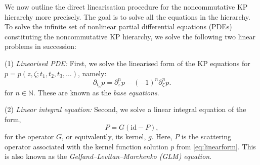 \documentclass[5p,twocolumn]{elsarticle}
\newcommand*{\id}{{\mathrm{id}}}
\newcommand*{\pa}{{\partial}}
\begin{document}
We now outline the direct linearisation procedure for the noncommutative KP hierarchy more precisely. 
The goal is to solve all the equations in the hierarchy.
To solve the infinite set of nonlinear partial differential equations (PDEs) constituting the noncommutative KP hierarchy,
we solve the following two linear problems in succession:

(1) \emph{Linearised PDE:} First, we solve the linearised form of the KP equations for $p=p(z,\zeta;t_1,t_2,t_3,\ldots)$, namely:
\begin{equation}\label{eq:linearform}
  \pa_{t_n}p=\pa_z^np-(-1)^n\pa_\zeta^np.
\end{equation}
for $n\in\mathbb N$. These are known as the \emph{base equations}. 

(2) \emph{Linear integral equation:} Second, we solve a linear integral equation of the form,
\begin{equation}\label{eq:GLMeqintro}
  P=G(\id-P),
\end{equation}
for the operator $G$, or equivalently, its kernel, $g$.
Here, $P$ is the scattering operator associated with the kernel function solution $p$ from \eqref{eq:linearform}.
This is also known as the \emph{Gelfand--Levitan--Marchenko (GLM) equation}.  
\end{document}
